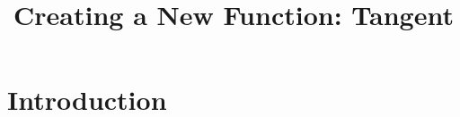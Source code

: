 \documentclass{ximera}
\author{}
\title{Creating a New Function: Tangent}
\begin{document}
\begin{abstract}
  
\end{abstract}
\maketitle






\section{Introduction}



\end{document}
